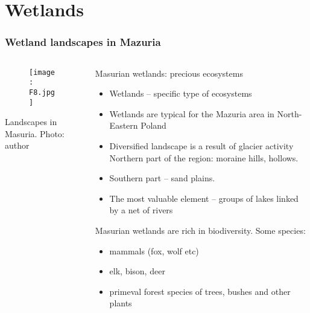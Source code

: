 \documentclass[pdflatex,compress,8pt,
	xcolor={dvipsnames,dvipsnames,svgnames,x11names,table},
	hyperref={colorlinks = true,
	breaklinks = true, urlcolor = NavyBlue, breaklinks = true}]{beamer}
\begin{document}
\section{Wetlands}
\begin{frame}\frametitle{Wetland landscapes in Mazuria}
\begin{minipage}[0.4\textheight]{\textwidth}
\begin{columns}[T]
\begin{column}{0.5\textwidth}
\vspace{2em}
\begin{figure}[H]
	\centering
		\texttt{[image: F8.jpg]}
\end{figure}
\footnotesize{Landscapes in Masuria. Photo: author}
\end{column}
\begin{column}{0.5\textwidth}
\vspace{2em} 
Masurian wetlands: precious ecosystems
\begin{itemize}
            \item Wetlands – specific type of ecosystems
            \item Wetlands are typical for the Mazuria area in North-Eastern Poland
            \item Diversified landscape is a result of glacier activity Northern part of the region: moraine hills, hollows.
            \item Southern part – sand plains.
            \item The most valuable element – groups of lakes linked by a net of rivers
\end{itemize}
Masurian wetlands are rich in biodiversity. Some species:
\begin{itemize}
	\item mammals (fox, wolf etc)
	\item elk, bison, deer
	\item primeval forest species of trees, bushes and other plants
\end{itemize}
\end{column}
\end{columns}
\end{minipage}
\end{frame}
\end{document}
